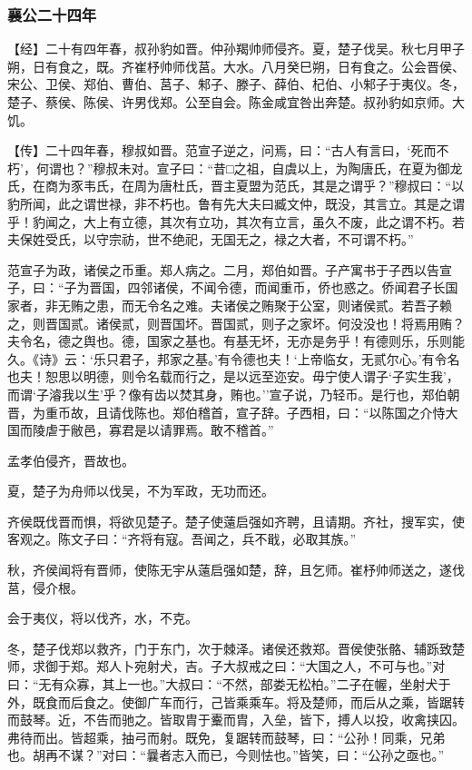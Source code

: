 \documentclass[]{article}
\begin{document}
\hypertarget{header-n2160}{%
\subsubsection{襄公二十四年}\label{header-n2160}}

【经】二十有四年春，叔孙豹如晋。仲孙羯帅师侵齐。夏，楚子伐吴。秋七月甲子朔，日有食之，既。齐崔杼帅师伐莒。大水。八月癸巳朔，日有食之。公会晋侯、宋公、卫侯、郑伯、曹伯、莒子、邾子、滕子、薛伯、杞伯、小邾子于夷仪。冬，楚子、蔡侯、陈侯、许男伐郑。公至自会。陈金咸宜咎出奔楚。叔孙豹如京师。大饥。

【传】二十四年春，穆叔如晋。范宣子逆之，问焉，曰：``古人有言曰，`死而不朽'，何谓也？''穆叔未对。宣子曰：``昔□之祖，自虞以上，为陶唐氏，在夏为御龙氏，在商为豕韦氏，在周为唐杜氏，晋主夏盟为范氏，其是之谓乎？''穆叔曰：``以豹所闻，此之谓世禄，非不朽也。鲁有先大夫曰臧文仲，既没，其言立。其是之谓乎！豹闻之，大上有立德，其次有立功，其次有立言，虽久不废，此之谓不朽。若夫保姓受氏，以守宗祊，世不绝祀，无国无之，禄之大者，不可谓不朽。''

范宣子为政，诸侯之币重。郑人病之。二月，郑伯如晋。子产寓书于子西以告宣子，曰：``子为晋国，四邻诸侯，不闻令德，而闻重币，侨也惑之。侨闻君子长国家者，非无贿之患，而无令名之难。夫诸侯之贿聚于公室，则诸侯贰。若吾子赖之，则晋国贰。诸侯贰，则晋国坏。晋国贰，则子之家坏。何没没也！将焉用贿？夫令名，德之舆也。德，国家之基也。有基无坏，无亦是务乎！有德则乐，乐则能久。《诗》云：`乐只君子，邦家之基。'有令德也夫！`上帝临女，无贰尔心。'有令名也夫！恕思以明德，则令名载而行之，是以远至迩安。毋宁使人谓子`子实生我'，而谓`子濬我以生'乎？像有齿以焚其身，贿也。''宣子说，乃轻币。是行也，郑伯朝晋，为重币故，且请伐陈也。郑伯稽首，宣子辞。子西相，曰：``以陈国之介恃大国而陵虐于敝邑，寡君是以请罪焉。敢不稽首。''

孟孝伯侵齐，晋故也。

夏，楚子为舟师以伐吴，不为军政，无功而还。

齐侯既伐晋而惧，将欲见楚子。楚子使薳启强如齐聘，且请期。齐社，搜军实，使客观之。陈文子曰：``齐将有寇。吾闻之，兵不戢，必取其族。''

秋，齐侯闻将有晋师，使陈无宇从薳启强如楚，辞，且乞师。崔杼帅师送之，遂伐莒，侵介根。

会于夷仪，将以伐齐，水，不克。

冬，楚子伐郑以救齐，门于东门，次于棘泽。诸侯还救郑。晋侯使张骼、辅跞致楚师，求御于郑。郑人卜宛射犬，吉。子大叔戒之曰：``大国之人，不可与也。''对曰：``无有众寡，其上一也。''大叔曰：``不然，部娄无松柏。''二子在幄，坐射犬于外，既食而后食之。使御广车而行，己皆乘乘车。将及楚师，而后从之乘，皆踞转而鼓琴。近，不告而驰之。皆取胄于櫜而胄，入垒，皆下，搏人以投，收禽挟囚。弗待而出。皆超乘，抽弓而射。既免，复踞转而鼓琴，曰：``公孙！同乘，兄弟也。胡再不谋？''对曰：``曩者志入而已，今则怯也。''皆笑，曰：``公孙之亟也。''
\end{document}
